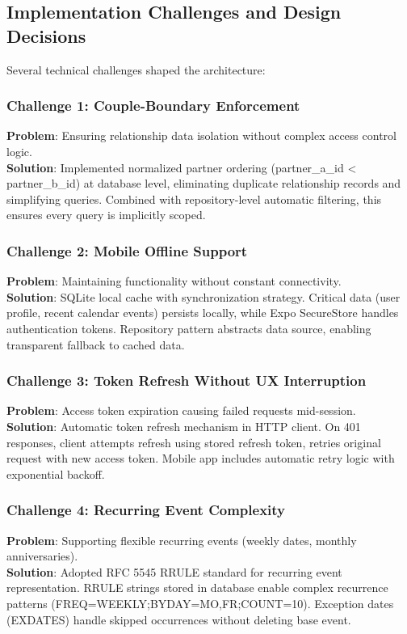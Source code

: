 \documentclass[sigconf, authorversion, nonacm, margin=0.75in]{acmart}
\begin{document}
\subsection{Implementation Challenges and Design Decisions}
Several technical challenges shaped the architecture:

\subsubsection{Challenge 1: Couple-Boundary Enforcement}
\textbf{Problem}: Ensuring relationship data isolation without complex access control logic.\\[0.1cm]
\textbf{Solution}: Implemented normalized partner ordering (partner\_a\_id < partner\_b\_id) at database level, eliminating duplicate relationship records and simplifying queries. Combined with repository-level automatic filtering, this ensures every query is implicitly scoped.

\subsubsection{Challenge 2: Mobile Offline Support}
\textbf{Problem}: Maintaining functionality without constant connectivity.\\[0.1cm]
\textbf{Solution}: SQLite local cache with synchronization strategy. Critical data (user profile, recent calendar events) persists locally, while Expo SecureStore handles authentication tokens. Repository pattern abstracts data source, enabling transparent fallback to cached data.

\subsubsection{Challenge 3: Token Refresh Without UX Interruption}
\textbf{Problem}: Access token expiration causing failed requests mid-session.\\[0.1cm]
\textbf{Solution}: Automatic token refresh mechanism in HTTP client. On 401 responses, client attempts refresh using stored refresh token, retries original request with new access token. Mobile app includes automatic retry logic with exponential backoff.

\subsubsection{Challenge 4: Recurring Event Complexity}
\textbf{Problem}: Supporting flexible recurring events (weekly dates, monthly anniversaries).\\[0.1cm]
\textbf{Solution}: Adopted RFC 5545 RRULE standard for recurring event representation. RRULE strings stored in database enable complex recurrence patterns (FREQ=WEEKLY;BYDAY=MO,FR;COUNT=10). Exception dates (EXDATES) handle skipped occurrences without deleting base event.
\end{document}
